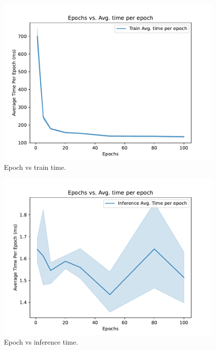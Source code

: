 \documentclass[sigplan,screen]{acmart}
\begin{document}
\begin{figure}[htb]
\centering\includegraphics[width=1.0\columnwidth]{images/epoch_vs_train_time.pdf}
\caption{Epoch vs train time.}
\label{fig:epochs-vs-accuracy-c}
\end{figure}

\begin{figure}[htb]
\centering\includegraphics[width=1.0\columnwidth]{images/epoch_vs_test_time.pdf}
\caption{Epoch vs inference time.}
\label{fig:epochs-vs-accuracy-d}
\end{figure}
\end{document}
